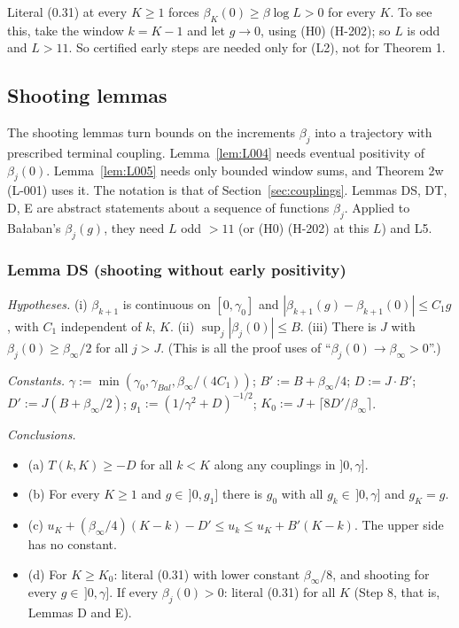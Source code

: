 \begin{remark}
Literal (0.31) at every $K\ge 1$ forces $\beta_K(0)\ge\beta\log L>0$ for every $K$. To see this, take the window $k=K-1$ and let $g\to 0$, using (H0) (H-202); so $L$ is odd and $L>11$. So certified early steps are needed only for (L2), not for Theorem 1.
\end{remark}

\subsection{Shooting lemmas}\label{sec:shooting}

The shooting lemmas turn bounds on the increments $\beta_j$ into a trajectory with prescribed terminal coupling. Lemma~\ref{lem:L004} needs eventual positivity of $\beta_j(0)$. Lemma~\ref{lem:L005} needs only bounded window sums, and Theorem 2w (L-001) uses it. The notation is that of Section~\ref{sec:couplings}. Lemmas DS, DT, D, E are abstract statements about a sequence of functions $\beta_j$. Applied to Ba{\l}aban's $\beta_j(g)$, they need $L$ odd $>11$ (or (H0) (H-202) at this $L$) and L5.

\subsubsection{Lemma DS (shooting without early positivity)}\label{sec:Dprime}

\begin{lemma}[Lemma DS]\label{lem:L004}
\emph{Hypotheses.} (i) $\beta_{k+1}$ is continuous on $[0,\gamma_0]$ and $|\beta_{k+1}(g)-\beta_{k+1}(0)|\le C_1 g$, with $C_1$ independent of $k$, $K$. (ii) $\sup_j|\beta_j(0)|\le B$. (iii) There is $J$ with $\beta_j(0)\ge\beta_\infty/2$ for all $j>J$. (This is all the proof uses of ``$\beta_j(0)\to\beta_\infty>0$''.)

\emph{Constants.} $\gamma := \min(\gamma_0,\gamma_{Bal},\beta_\infty/(4C_1))$; $B' := B+\beta_\infty/4$; $D := J\cdot B'$; $D' := J(B+\beta_\infty/2)$; $g_1 := (1/\gamma^2+D)^{-1/2}$; $K_0 := J+\lceil 8D'/\beta_\infty\rceil$.

\emph{Conclusions.}
\begin{itemize}
\item (a) $T(k,K)\ge -D$ for all $k<K$ along any couplings in $]0,\gamma]$.
\item (b) For every $K\ge 1$ and $g\in\,]0,g_1]$ there is $g_0$ with all $g_k\in\,]0,\gamma]$ and $g_K = g$.
\item (c) $u_K + (\beta_\infty/4)(K-k) - D' \le u_k \le u_K + B'(K-k)$. The upper side has no constant.
\item (d) For $K\ge K_0$: literal (0.31) with lower constant $\beta_\infty/8$, and shooting for every $g\in\,]0,\gamma]$. If every $\beta_j(0)>0$: literal (0.31) for all $K$ (Step 8, that is, Lemmas D and E).
\end{itemize}
\end{lemma}

